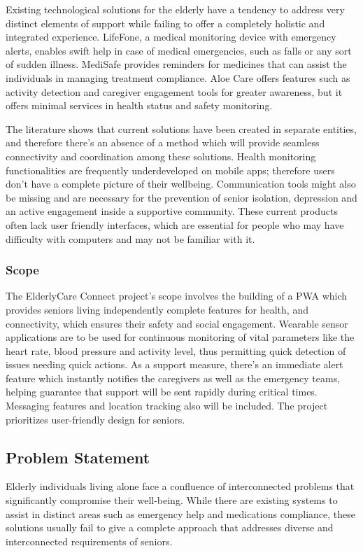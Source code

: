 \documentclass[a4paper, 12pt]{article}
\begin{document}
Existing technological solutions for the elderly have a tendency to address very distinct elements of support while failing to offer a completely holistic and integrated experience. LifeFone, a medical monitoring device with emergency alerts, enables swift help in case of medical emergencies, such as falls or any sort of sudden illness.  MediSafe provides reminders for medicines that can assist the individuals in managing treatment compliance.  Aloe Care offers features such as activity detection and caregiver engagement tools for greater awareness, but it offers minimal services in health status and safety monitoring.

The literature shows that current solutions have been created in separate entities, and therefore there's an absence of a method which will provide seamless connectivity and coordination among these solutions. Health monitoring functionalities are frequently underdeveloped on mobile apps; therefore users don’t have a complete picture of their wellbeing.  Communication tools might also be missing and are necessary for the prevention of senior isolation, depression and an active engagement inside a supportive community.   These current products often lack user friendly interfaces, which are essential for people who may have difficulty with computers and may not be familiar with it.

\subsubsection{\textbf{\large Scope}}

The ElderlyCare Connect project's scope involves the building of a PWA which provides seniors living independently complete features for health, and connectivity, which ensures their safety and social engagement. Wearable sensor applications are to be used for continuous monitoring of vital parameters like the heart rate, blood pressure and activity level, thus permitting quick detection of issues needing quick actions. As a support measure, there's an immediate alert feature which instantly notifies the caregivers as well as the emergency teams, helping guarantee that support will be sent rapidly during critical times. Messaging features and location tracking also will be included. The project prioritizes user-friendly design for seniors.
 
\subsection {\textbf{\Large Problem Statement}}
Elderly individuals living alone face a confluence of interconnected problems that significantly compromise their well-being. While there are existing systems to assist in distinct areas such as emergency help and medications compliance, these solutions usually fail to give a complete approach that addresses diverse and interconnected requirements of seniors.
\end{document}

